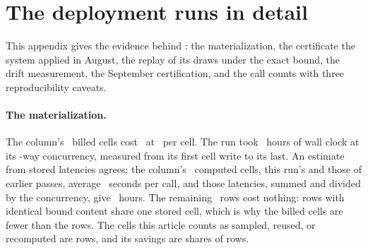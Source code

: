 \begin{table}[t]
\caption{Certified savings of the main seed (oracle calls in
parentheses) for every configuration and bound; ``refused'' gives the
calls spent before the stop.}
\label{tab:boundsgrid}
\centering\scriptsize
\setlength{\tabcolsep}{3pt}

\end{table}

\FloatBarrier
\keepheading
\section{The deployment runs in detail}
\label{app:deploy}
This appendix gives the evidence behind : the
materialization, the certificate the system applied in August, the
replay of its draws under the exact bound, the drift measurement, the
September certification, and the call counts with three
reproducibility caveats.

\begin{table}[t]
\caption{The Maurer--Pontil certifications on the deployment column,
kept for the record. Theorem~\ref{thm:valid} does not cover them
(). The first row is the certificate the system
applied in August 2026. Columns as in Table~\ref{tab:deploy}.}
\label{tab:deploymp}
\centering\small

\end{table}

\keeprunin
\paragraph{The materialization.} The column's \deployMatCells\ billed
cells cost \deployMatCost\ at \perCellCost\ per cell. The run took
\deployMatSpanHours\ hours of wall clock at its \deployConcurrency-way
concurrency, measured from its first cell write to its last. An
estimate from stored latencies agrees: the column's
\deployMatLatencyCells\ computed cells, this run's and those of earlier
passes, average \deployMatMeanLatencyS\ seconds per call, and those latencies, summed and divided by the
concurrency, give \deployMatHours\ hours. The remaining
\deployFreeRows\ rows cost nothing: rows with identical bound content
share one stored cell, which is why the billed cells are fewer than the
rows. The cells this article counts as sampled, reused, or
recomputed are rows, and its savings are shares of rows.

\keeprunin
